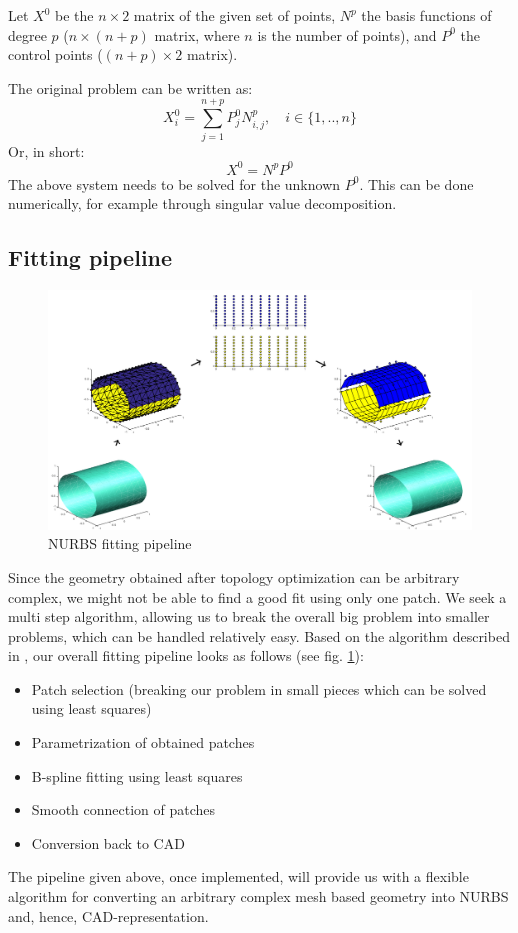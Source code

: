 Let $X^{0}$ be the $n \times 2$ matrix of the given set of points, $N^{p}$ the basis functions of degree $p$ ($n \times (n+p)$ matrix, where $n$ is the number of points), and $P^{0}$ the control points ($(n+p) \times 2$ matrix).

The original problem can be written as:
\begin{equation}
X_{i}^{0} = \sum\limits_{j=1}^{n+p} P_{j}^{0} N_{i,j}^{p}, \quad i \in \{1,..,n\}
\end{equation}
Or, in short:
\begin{equation}
X^{0} = N^{p} P^{0}
\end{equation}
The above system needs to be solved for the unknown $P^{0}$. This can be done numerically, for example through singular value decomposition. 

\subsection{Fitting pipeline}
\begin{figure}
\centering
  \includegraphics[width=.85\linewidth]{Fitting_workflow.png}
  \caption{NURBS fitting pipeline}
  \label{fig:fitting_pipeline}
\end{figure}
Since the geometry obtained after topology optimization can be arbitrary complex, we might not be able to find a good fit using only one patch. We seek a multi step algorithm, allowing us to break the overall big problem into smaller problems, which can be handled relatively easy.
Based on the algorithm described in \cite{eck1996automatic}, our overall fitting pipeline looks as follows (see fig. \ref{fig:fitting_pipeline}):
\begin{itemize}
	\item Patch selection (breaking our problem in small pieces which can be solved using least squares)
	\item Parametrization of obtained patches
	\item B-spline fitting using least squares
	\item Smooth connection of patches
	\item Conversion back to CAD
\end{itemize}

The pipeline given above, once implemented, will provide us with a flexible algorithm for converting an arbitrary complex mesh based geometry into NURBS and, hence, CAD-representation.
